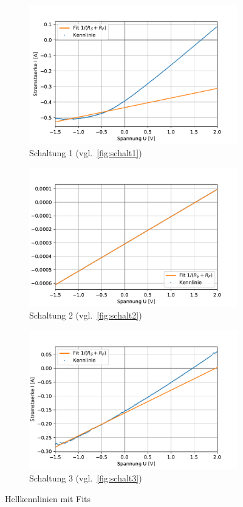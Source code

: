 \documentclass[slug=SZ, room=Hermann-Krone-Bau\,\ Labor\ 1.25, supervisor=Martin\ Kroll]{../../Lab_Report_LaTeX/lab_report}
\begin{document}
\begin{figure}[H]\centering
	\begin{subfigure}[b]{1\textwidth}\centering
		\includegraphics[width=.5\columnwidth]{figs/python/3x3_schaltung_2_rsrp.pdf}
		\caption{Schaltung 1 (vgl.~\ref{fig:schalt1})}
		\label{diag:hellschalt1fit}
	\end{subfigure}
	\begin{subfigure}[b]{1\textwidth}\centering
		\includegraphics[width=.5\columnwidth]{figs/python/3x3_schaltung_3_rsrp.pdf}
		\caption{Schaltung 2 (vgl.~\ref{fig:schalt2})}
		\label{diag:hellschalt2fit}
	\end{subfigure}
	\begin{subfigure}[b]{1\textwidth}\centering
		\includegraphics[width=.5\columnwidth]{figs/python/3x3_schaltung_4_rsrp.pdf}
		\caption{Schaltung 3 (vgl.~\ref{fig:schalt3})}
		\label{diag:hellschalt3fit}
	\end{subfigure}
	\caption{Hellkennlinien mit Fits}
	\label{fig:hellkennfit}
\end{figure}
\end{document}
